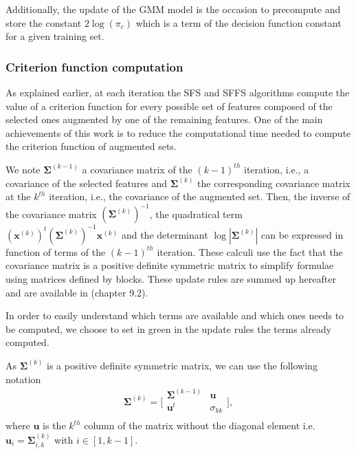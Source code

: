 \documentclass[a4paper,11pt,DIV=16,abstracton]{scrartcl}
\begin{document}
        Additionally, the update of the GMM model is the occasion to precompute and store the constant $2 \log (\pi_c)$ which is a term of the decision function constant for a given training set.

        \subsubsection{Criterion function computation}
        \label{sec:update-crit}

        As explained earlier, at each iteration the SFS and SFFS algorithms compute the value of a criterion function for every possible set of features composed of the selected ones augmented by one of the remaining features. One of the main achievements of this work is to reduce the computational time needed to compute the criterion function of augmented sets.

        We note $\boldsymbol{\Sigma}^{(k-1)}$ a covariance matrix of the $(k-1)^{th}$ iteration, i.e., a covariance of the selected features and $\boldsymbol{\Sigma}^{(k)}$ the corresponding covariance matrix at the $k^{th}$ iteration, i.e., the covariance of the augmented set. Then, the inverse of the covariance matrix $(\boldsymbol{\Sigma}^{(k)})^{-1}$, the quadratical term $(\mathbf{x}^{(k)})^t (\boldsymbol{\Sigma}^{(k)})^{-1} \mathbf{x}^{(k)}$ and the determinant $\log |\boldsymbol{\Sigma}^{(k)}|$ can be expressed in function of terms of the $(k-1)^{th}$ iteration. These calculi use the fact that the covariance matrix is a positive definite symmetric matrix to simplify formulae using matrices defined by blocks. These update rules are summed up hereafter and are available in \cite{webb2003statistical} (chapter 9.2).

        In order to easily understand which terms are available and which ones needs to be computed, we choose to set in green in the update rules the terms already computed.

        As $\boldsymbol{\Sigma}^{(k)}$ is a positive definite symmetric matrix, we can use the following notation
        \begin{equation*}
            \boldsymbol{\Sigma}^{(k)} =
            \bigg[\begin{array}{cc}
            \boldsymbol{\Sigma}^{(k-1)} & \mathbf{u}      \\
            \mathbf{u}^t          & \sigma_{kk} \\
            \end{array}\bigg],
        \end{equation*}
        where $\mathbf{u}$ is the $k^{th}$ column of the matrix without the diagonal element i.e. $\mathbf{u}_{i} = \boldsymbol{\Sigma}^{(k)}_{i,k}$ with $i \in [1,k-1]$.
\end{document}
